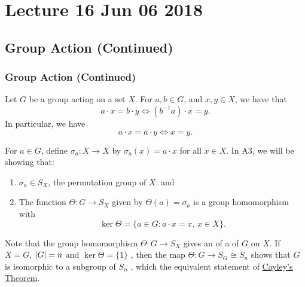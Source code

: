 \chapter{Lecture 16 Jun 06 2018}%
\label{chp:lecture_16_jun_06_2018}

\section{Group Action (Continued)}%
\label{sec:group_action_continued}

\subsection{Group Action (Continued)}%
\label{sub:group_action_continued}

\begin{remark}
  Let $G$ be a group acting on a set $X$. For $a, b \in G$, and $x, y \in X$, we have that
  \begin{equation*}
    a \cdot x = b \cdot y \iff (b^{-1} a) \cdot x = y.
  \end{equation*}
  In particular, we have
  \begin{equation*}
    a \cdot x = a \cdot y \iff x = y.
  \end{equation*}
\end{remark}

For $a \in G$, define $\sigma_a : X \to X$ by $\sigma_a(x) = a \cdot x$ for all $x \in X$. In A3, we will be showing that:
\begin{enumerate}
  \item $\sigma_a \in S_X$, the permutation group of $X$; and
  \item The function $\Theta : G \to S_X$ given by $\Theta(a) = \sigma_a$ is a group homomorphism with
    \begin{equation*}
      \ker \Theta = \{a \in G : a \cdot x = x, \, x \in X \}.
    \end{equation*}
\end{enumerate}

Note that the group homomorphism $\Theta : G \to S_X$ gives an  of a  of $G$ on $X$. If $X = G$, $\left|G\right| = n$ and $\ker \Theta = \{1\}$ , then the map $\Theta : G \to S_G \cong S_n$ shows that $G$ is isomorphic to a subgroup of $S_n$ , which the equivalent statement of \hyperref[thm:cayley_s_theorem]{Cayley's Theorem}.

